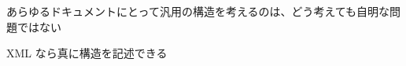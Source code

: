 \documentclass[14pt,dvipdfmx,uplatex]{beamer}
\begin{document}
\begin{frame}[plain]
  \begin{center}
    \color{kachi}\yasagoth
    あらゆるドキュメントにとって汎用の構造を考えるのは、どう考えても自明な問題ではない
  \end{center}
\end{frame}

{%
\begin{frame}[t]{\inhibitglue XML なら真に構造を記述できる }
  \sffamily
  \begin{center}
  \end{center}
\end{frame}
}
\end{document}
